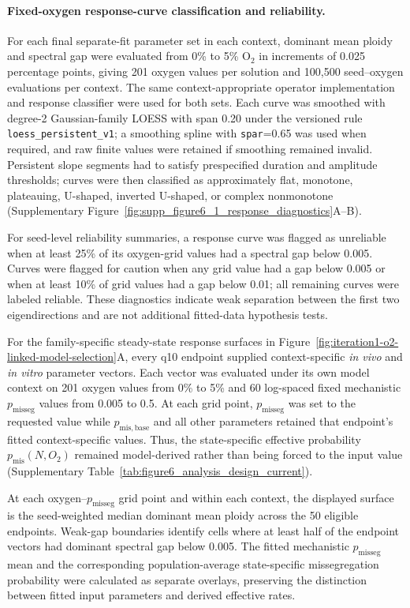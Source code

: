 \documentclass[11pt]{article}
\begin{document}
\paragraph{Fixed-oxygen response-curve classification and reliability.}
For each final separate-fit parameter set in each context, dominant mean ploidy and spectral gap were evaluated from 0\% to 5\% O$_2$ in increments of 0.025 percentage points, giving 201 oxygen values per solution and 100,500 seed--oxygen evaluations per context. The same context-appropriate operator implementation and response classifier were used for both sets. Each curve was smoothed with degree-2 Gaussian-family LOESS with span 0.20 under the versioned rule \texttt{loess\_persistent\_v1}; a smoothing spline with \texttt{spar}=0.65 was used when required, and raw finite values were retained if smoothing remained invalid. Persistent slope segments had to satisfy prespecified duration and amplitude thresholds; curves were then classified as approximately flat, monotone, plateauing, U-shaped, inverted U-shaped, or complex nonmonotone (Supplementary Figure~\ref{fig:supp_figure6_1_response_diagnostics}A--B).

For seed-level reliability summaries, a response curve was flagged as unreliable when at least 25\% of its oxygen-grid values had a spectral gap below 0.005. Curves were flagged for caution when any grid value had a gap below 0.005 or when at least 10\% of grid values had a gap below 0.01; all remaining curves were labeled reliable. These diagnostics indicate weak separation between the first two eigendirections and are not additional fitted-data hypothesis tests.

For the family-specific steady-state response surfaces in Figure~\ref{fig:iteration1-o2-linked-model-selection}A, every q10 endpoint supplied context-specific \textit{in vivo} and \textit{in vitro} parameter vectors. Each vector was evaluated under its own model context on 201 oxygen values from 0\% to 5\% and 60 log-spaced fixed mechanistic $p_{\mathrm{misseg}}$ values from 0.005 to 0.5. At each grid point, $p_{\mathrm{misseg}}$ was set to the requested value while $p_{\mathrm{mis,base}}$ and all other parameters retained that endpoint's fitted context-specific values. Thus, the state-specific effective probability $p_{\mathrm{mis}}(N,O_2)$ remained model-derived rather than being forced to the input value (Supplementary Table~\ref{tab:figure6_analysis_design_current}).

At each oxygen--$p_{\mathrm{misseg}}$ grid point and within each context, the displayed surface is the seed-weighted median dominant mean ploidy across the 50 eligible endpoints. Weak-gap boundaries identify cells where at least half of the endpoint vectors had dominant spectral gap below 0.005. The fitted mechanistic $p_{\mathrm{misseg}}$ mean and the corresponding population-average state-specific missegregation probability were calculated as separate overlays, preserving the distinction between fitted input parameters and derived effective rates.
\end{document}
